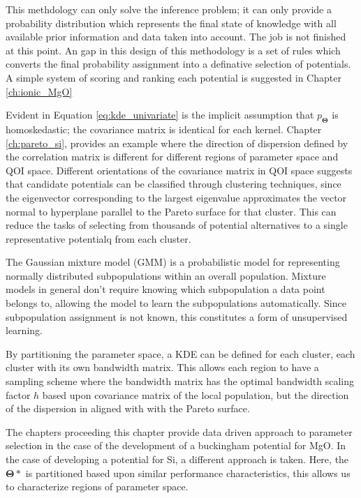 This methdology can only solve the inference problem; it can only provide a probability distribution which represents the final state of knowledge with all available prior information and data taken into account.  The job is not finished at this point.  An gap in this design of this methodology is a set of rules which converts the final probability assignment into a definative selection of potentials.  A simple system of scoring and ranking each potential is suggested in Chapter \ref{ch:ionic_MgO}

Evident in Equation \ref{eq:kde_univariate} is the implicit assumption that $p_{\bm{\Theta}}$ is homoskedastic; the covariance matrix is identical for each kernel.  Chapter \ref{ch:pareto_si}, provides an example where the direction of dispersion defined by the correlation matrix is different for different regions of parameter space and QOI space.  Different orientations of the covariance matrix in QOI space suggests that candidate potentials can be classified through clustering techniques, since the eigenvector corresponding to the largest eigenvalue approximates the vector normal to hyperplane parallel to the Pareto surface for that cluster.  This can reduce the tasks of selecting from thousands of potential alternatives to a single representative potentialq from each cluster.

The Gaussian mixture model (GMM) is a probabilistic model for representing normally distributed subpopulations within an overall population. Mixture models in general don't require knowing which subpopulation a data point belongs to, allowing the model to learn the subpopulations automatically. Since subpopulation assignment is not known, this constitutes a form of unsupervised learning.

By partitioning the parameter space, a KDE can be defined for each cluster, each cluster with its own bandwidth matrix.  This allows each region to have a sampling scheme where the bandwidth matrix has the optimal bandwidth scaling factor $h$ based upon covariance matrix of the local population, but the direction of the dispersion in aligned with with the Pareto surface.

The chapters proceeding this chapter provide data driven approach to parameter selection in the case of the development of a buckingham potential for MgO.  In the case of developing a potential for Si, a different approach is taken.  Here, the $\bm{\Theta}*$ is partitioned based upon similar performance characteristics, this allows us to characterize regions of parameter space.
